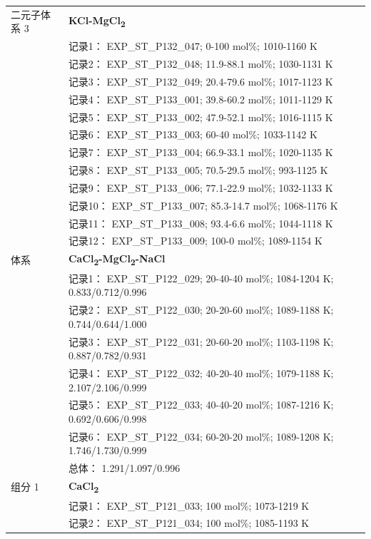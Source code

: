 \documentclass[12pt]{article}
\begin{document}
{\begin{longtable}[]{@{}
  >{\raggedright\arraybackslash}p{}
  >{\raggedright\arraybackslash}p{}@{}}
二元子体系 3  & \textbf{KCl-MgCl\textsubscript{2}} \\
 & 记录1： EXP\_ST\_P132\_047; 0-100 mol\%; 1010-1160 K \\
 & 记录2： EXP\_ST\_P132\_048; 11.9-88.1 mol\%; 1030-1131 K \\
 & 记录3： EXP\_ST\_P132\_049; 20.4-79.6 mol\%; 1017-1123 K \\
 & 记录4： EXP\_ST\_P133\_001; 39.8-60.2 mol\%; 1011-1129 K \\
 & 记录5： EXP\_ST\_P133\_002; 47.9-52.1 mol\%; 1016-1115 K \\
 & 记录6： EXP\_ST\_P133\_003; 60-40 mol\%; 1033-1142 K \\
 & 记录7： EXP\_ST\_P133\_004; 66.9-33.1 mol\%; 1020-1135 K \\
 & 记录8： EXP\_ST\_P133\_005; 70.5-29.5 mol\%; 993-1125 K \\
 & 记录9： EXP\_ST\_P133\_006; 77.1-22.9 mol\%; 1032-1133 K \\
 & 记录10： EXP\_ST\_P133\_007; 85.3-14.7 mol\%; 1068-1176 K \\
 & 记录11： EXP\_ST\_P133\_008; 93.4-6.6 mol\%; 1044-1118 K \\
 & 记录12： EXP\_ST\_P133\_009; 100-0 mol\%; 1089-1154 K  \\

\midrule
体系 & \textbf{CaCl\textsubscript{2}-MgCl\textsubscript{2}-NaCl} \\
 & 记录1： EXP\_ST\_P122\_029; 20-40-40 mol\%; 1084-1204 K; 0.833/0.712/0.996 \\
 & 记录2： EXP\_ST\_P122\_030; 20-20-60 mol\%; 1089-1188 K; 0.744/0.644/1.000 \\
 & 记录3： EXP\_ST\_P122\_031; 20-60-20 mol\%; 1103-1198 K; 0.887/0.782/0.931 \\
 & 记录4： EXP\_ST\_P122\_032; 40-20-40 mol\%; 1079-1188 K; 2.107/2.106/0.999 \\
 & 记录5： EXP\_ST\_P122\_033; 40-40-20 mol\%; 1087-1216 K; 0.692/0.606/0.998 \\
 & 记录6： EXP\_ST\_P122\_034; 60-20-20 mol\%; 1089-1208 K; 1.746/1.730/0.999 \\
 & 总体： 1.291/1.097/0.996  \\

组分 1  & \textbf{CaCl\textsubscript{2}} \\
 & 记录1： EXP\_ST\_P121\_033; 100 mol\%; 1073-1219 K \\
 & 记录2： EXP\_ST\_P121\_034; 100 mol\%; 1085-1193 K  \\


\end{longtable}}
\end{document}
